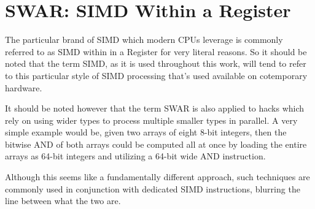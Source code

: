 
\section{SWAR: SIMD Within a Register}
The particular brand of SIMD which modern CPUs leverage is commonly referred to
as SIMD within in a Register for very literal reasons. So it should be noted
that the term SIMD, as it is used throughout this work, will tend to refer to
this particular style of SIMD processing that's used available on cotemporary
hardware.

It should be noted however that the term SWAR is also applied to hacks which
rely on using wider types to process multiple smaller types in parallel. A very
simple example would be, given two arrays of eight 8-bit integers, then the
bitwise AND of both arrays could be computed all at once by loading the entire
arrays as 64-bit integers and utilizing a 64-bit wide AND instruction.

Although this seems like a fundamentally different approach, such techniques are
commonly used in conjunction with dedicated SIMD instructions, blurring the line
between what the two are.
